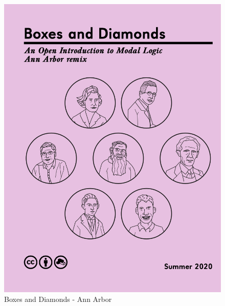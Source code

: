 \documentclass[ignorenonframetext,]{beamer}
\renewcommand{\,}{\text{, }}
\begin{document}
\begin{frame}

\begin{figure}
\centering
\includegraphics[width=\textwidth,height=0.8\textheight]{images/0_1_a_Boxes_and_Diamonds_AA.png}
\caption{Boxes and Diamonds - Ann Arbor}
\end{figure}

\end{frame}
\end{document}
